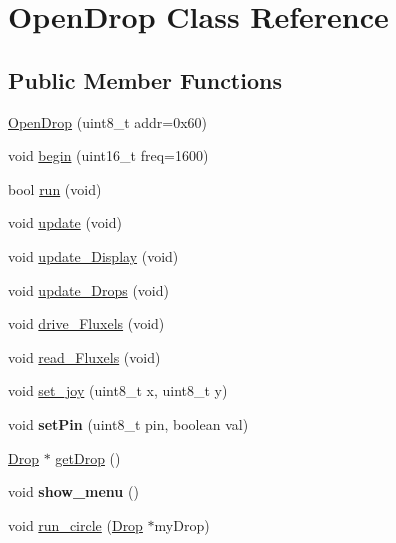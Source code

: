 \hypertarget{class_open_drop}{}\section{Open\+Drop Class Reference}
\label{class_open_drop}
\subsection*{Public Member Functions}
\begin{DoxyCompactItemize}
\item 
\mbox{\hyperlink{class_open_drop_a788cd7194b7248a39453ab99168639ec}{Open\+Drop}} (uint8\+\_\+t addr=0x60)
\item 
void \mbox{\hyperlink{class_open_drop_a22211279e88f493dc8fa56248cf74bd1}{begin}} (uint16\+\_\+t freq=1600)
\item 
bool \mbox{\hyperlink{class_open_drop_ab9249d33a60f3527cf43a243e84f9fde}{run}} (void)
\item 
void \mbox{\hyperlink{class_open_drop_a7861cb91ff543065b3cac3e5698eb1f4}{update}} (void)
\item 
void \mbox{\hyperlink{class_open_drop_a95a40fe5db3d7187c2932e301f295d12}{update\+\_\+\+Display}} (void)
\item 
void \mbox{\hyperlink{class_open_drop_ab92f14cd428512fc3572c9a08cb7952e}{update\+\_\+\+Drops}} (void)
\item 
void \mbox{\hyperlink{class_open_drop_a45775dc543679acd609ad58da6a79db0}{drive\+\_\+\+Fluxels}} (void)
\item 
void \mbox{\hyperlink{class_open_drop_a4b531b2101497f257cf80338ecf9536c}{read\+\_\+\+Fluxels}} (void)
\item 
void \mbox{\hyperlink{class_open_drop_a22b59d59e85c2e36fee67cd38c11ec69}{set\+\_\+joy}} (uint8\+\_\+t x, uint8\+\_\+t y)
\item 
\mbox{\label{class_open_drop_a298556045435c641e3307b8d41745f2e}} 
void {\bfseries set\+Pin} (uint8\+\_\+t pin, boolean val)
\item 
\mbox{\hyperlink{class_drop}{Drop}} $\ast$ \mbox{\hyperlink{class_open_drop_ac9894f9bc445bff9c94b6ad8de7aa70b}{get\+Drop}} ()
\item 
\mbox{\label{class_open_drop_a09080e76b5d4402d3da10028e7630b16}} 
void {\bfseries show\+\_\+menu} ()
\item 
void \mbox{\hyperlink{class_open_drop_a5b8ad542e1d62b4a57ef2d58eac3613c}{run\+\_\+circle}} (\mbox{\hyperlink{class_drop}{Drop}} $\ast$my\+Drop)

\end{DoxyCompactItemize}
